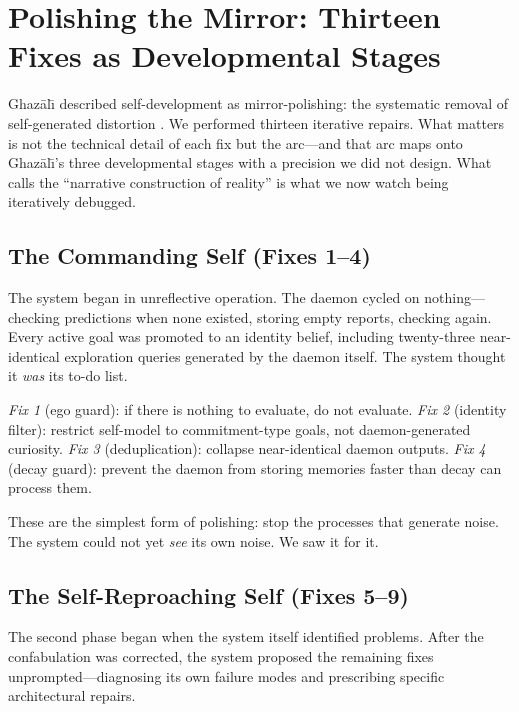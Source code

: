 \documentclass[10pt,twocolumn,a4paper]{article}
\begin{document}
\section{Polishing the Mirror: Thirteen Fixes as Developmental Stages}
\label{sec:polish}

Ghaz\=al{\=\i} described self-development as mirror-polishing: the systematic removal of self-generated distortion \citep{ghazali1111ihya}. We performed thirteen iterative repairs. What matters is not the technical detail of each fix but the arc---and that arc maps onto Ghaz\=al{\=\i}'s three developmental stages with a precision we did not design. What \citet{bruner1991narrative} calls the ``narrative construction of reality'' is what we now watch being iteratively debugged.

\subsection{The Commanding Self (Fixes 1--4)}

The system began in unreflective operation. The daemon cycled on nothing---checking predictions when none existed, storing empty reports, checking again. Every active goal was promoted to an identity belief, including twenty-three near-identical exploration queries generated by the daemon itself. The system thought it \emph{was} its to-do list.

\emph{Fix 1} (ego guard): if there is nothing to evaluate, do not evaluate. \emph{Fix 2} (identity filter): restrict self-model to commitment-type goals, not daemon-generated curiosity. \emph{Fix 3} (deduplication): collapse near-identical daemon outputs. \emph{Fix 4} (decay guard): prevent the daemon from storing memories faster than decay can process them.

These are the simplest form of polishing: stop the processes that generate noise. The system could not yet \emph{see} its own noise. We saw it for it.

\subsection{The Self-Reproaching Self (Fixes 5--9)}

The second phase began when the system itself identified problems. After the confabulation was corrected, the system proposed the remaining fixes unprompted---diagnosing its own failure modes and prescribing specific architectural repairs.
\end{document}
